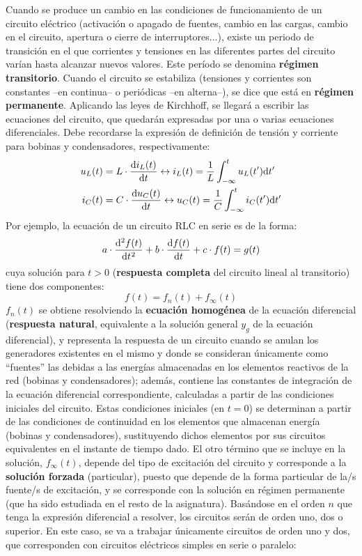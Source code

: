 	Cuando se produce un cambio en las condiciones de funcionamiento de un circuito eléctrico (activación o apagado de fuentes, cambio en las cargas, cambio en el circuito, apertura o cierre de interruptores...), existe un periodo de transición en el que corrientes y tensiones en las diferentes partes del circuito varían hasta alcanzar nuevos valores. Este período se denomina \textbf{régimen transitorio}. Cuando el circuito se estabiliza (tensiones y corrientes son constantes --en continua-- o periódicas --en alterna--), se dice que está en \textbf{régimen permanente}. Aplicando las leyes de Kirchhoff, se llegará a escribir las ecuaciones del circuito, que quedarán expresadas por una o varias ecuaciones diferenciales. Debe recordarse la expresión de definición de tensión y corriente para bobinas y condensadores, respectivamente:
	\begin{align*}
	    u_L(t) &= L \cdot \diff{i_L(t)}{t}
          \leftrightarrow
          i_L(t) = \frac{1}{L} \int^t_{-\infty}u_L(t') \mathrm{d}t'\\
          i_C(t) &= C \cdot \diff{u_C(t)}{t}
          \leftrightarrow
          u_C(t) = \frac{1}{C} \int^t_{-\infty}i_C(t') \mathrm{d}t'
	\end{align*}
	Por ejemplo, la ecuación de un circuito RLC en serie es de la forma:
\begin{equation*}
    a \cdot \diff[2]{f(t)}{t} + b \cdot \diff{f(t)}{t} + c \cdot f(t) = g(t)
\end{equation*}
cuya solución para $t > 0$ (\textbf{respuesta completa} del circuito lineal al transitorio) tiene dos componentes:
\begin{equation*}
    f(t) = f_n(t) + f_\infty(t)
\end{equation*}
$f_n(t)$ se obtiene resolviendo la \textbf{ecuación homogénea} de la ecuación diferencial (\textbf{respuesta natural}, equivalente a la solución general $y_g$ de la ecuación diferencial), y representa la respuesta de un circuito cuando se anulan los generadores existentes en el mismo y donde se consideran únicamente como ``fuentes'' las debidas a las energías almacenadas en los elementos reactivos de la red (bobinas y condensadores); además, contiene las constantes de integración de la ecuación diferencial correspondiente, calculadas a partir de las condiciones iniciales del circuito. Estas condiciones iniciales (en $t=0$) se determinan a partir de las condiciones de continuidad en los elementos que almacenan energía (bobinas y condensadores), sustituyendo dichos elementos por sus circuitos equivalentes en el instante de tiempo dado. El otro término que se incluye en la solución, $f_\infty(t)$, depende del tipo de excitación del circuito y corresponde a la \textbf{solución forzada} (particular), puesto que depende de la forma particular de la/s fuente/s de excitación, y se corresponde con la solución en régimen permanente (que ha sido estudiada en el resto de la asignatura). Basándose en el orden $n$ que tenga la expresión diferencial a resolver, los circuitos serán de orden uno, dos o superior. En este caso, se va a trabajar únicamente circuitos de orden uno y dos, que corresponden con circuitos eléctricos simples en serie o paralelo:
